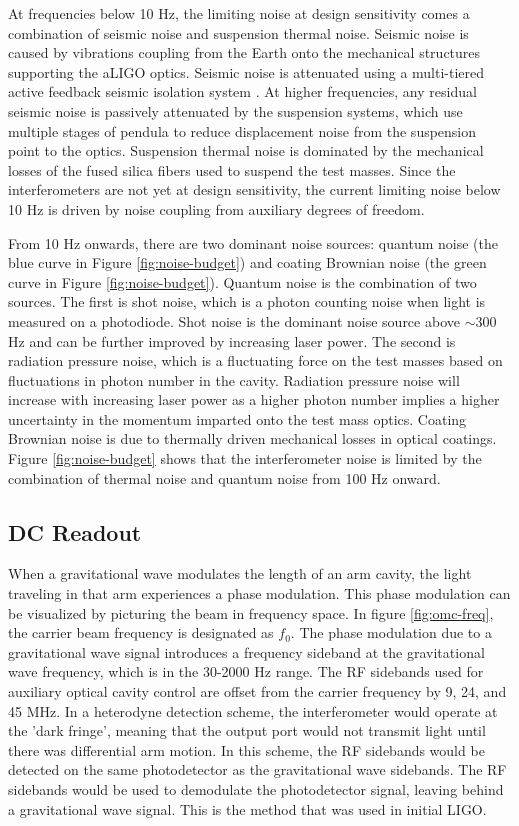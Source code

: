 At frequencies below 10 Hz, the limiting noise at design sensitivity 
comes a combination of seismic 
noise and suspension thermal noise. Seismic noise is caused by vibrations coupling 
from the Earth onto the mechanical structures supporting the aLIGO optics. 
Seismic noise is attenuated using 
a multi-tiered active feedback seismic isolation system \cite{SeiReview,HEPI}. At higher 
frequencies, any residual seismic noise is passively attenuated by the 
suspension systems, which use multiple stages of pendula to reduce displacement noise 
from the suspension point to the optics.
Suspension thermal noise is dominated by the mechanical losses of the fused 
silica fibers used to suspend the test masses. 
Since the interferometers are not yet at design sensitivity, the current 
limiting noise below 10 Hz is driven by noise coupling from auxiliary 
degrees of freedom.

From 10 Hz onwards, there are two dominant noise sources: quantum noise 
(the blue curve in Figure \ref{fig:noise-budget}) 
and coating Brownian noise (the green curve in Figure \ref{fig:noise-budget}). 
Quantum noise is the combination of two sources. 
The first is shot noise, which is a photon counting noise when light is measured 
on a photodiode. Shot noise is the dominant noise source above $\sim$300 Hz and 
can be further improved by increasing laser power. 
The second is radiation pressure noise, which is a fluctuating 
force on the test masses based on fluctuations in photon number in the cavity. 
Radiation pressure noise will increase with increasing laser power as 
a higher photon number implies a higher uncertainty in the momentum 
imparted onto the test mass optics.
Coating Brownian noise is due to thermally driven mechanical losses in optical 
coatings. 
Figure \ref{fig:noise-budget} shows that the interferometer noise is 
limited by the combination of thermal noise and quantum noise from 100 Hz 
onward. 
\subsection{DC Readout}

When a gravitational wave modulates the length of an arm cavity, the light 
traveling in that arm experiences a phase modulation. This phase modulation 
can be visualized by picturing the beam in frequency space. In figure 
\ref{fig:omc-freq}, the carrier beam frequency is designated as $f_0$. 
The phase modulation due to 
a gravitational wave signal introduces a frequency sideband at the 
gravitational wave frequency, which is in the 30-2000 Hz range. 
The 
RF sidebands used for auxiliary optical cavity control are offset from the 
carrier frequency by 9, 24, and 45 MHz. 
In a heterodyne detection scheme, the interferometer would operate at the 
'dark fringe', meaning that the output port would not transmit light until 
there was differential arm motion. In this scheme, the RF sidebands would be 
detected on the same photodetector as the gravitational wave sidebands. The 
RF sidebands would be used to demodulate the photodetector signal, leaving 
behind a gravitational wave signal. This is the method that was used in 
initial LIGO.

